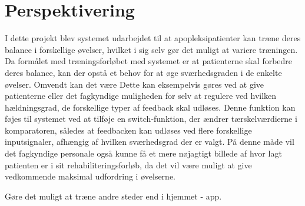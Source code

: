 \section{Perspektivering}
I dette projekt blev systemet udarbejdet til at apopleksipatienter kan træne deres balance i forskellige øvelser, hvilket i sig selv gør det muligt at variere træningen. Da formålet med træningsforløbet med systemet er at patienterne skal forbedre deres balance, kan der opstå et behov for at øge sværhedsgraden i de enkelte øvelser. Omvendt kan det være  Dette kan eksempelvis gøres ved at give patienterne eller det fagkyndige muligheden for selv at regulere ved hvilken hældningsgrad, de forskellige typer af feedback skal udløses. Denne funktion kan føjes til systemet ved at tilføje en switch-funktion, der ændrer tærskelværdierne i komparatoren, således at feedbacken kan udløses ved flere forskellige inputsignaler, afhængig af hvilken sværhedsgrad der er valgt. På denne måde vil det fagkyndige personale også kunne få et mere nøjagtigt billede af hvor lagt patienten er i sit rehabiliteringsforløb, da det vil være muligt at give vedkommende maksimal udfordring i øvelserne.

Gøre det muligt at træne andre steder end i hjemmet - app. 

 
    
